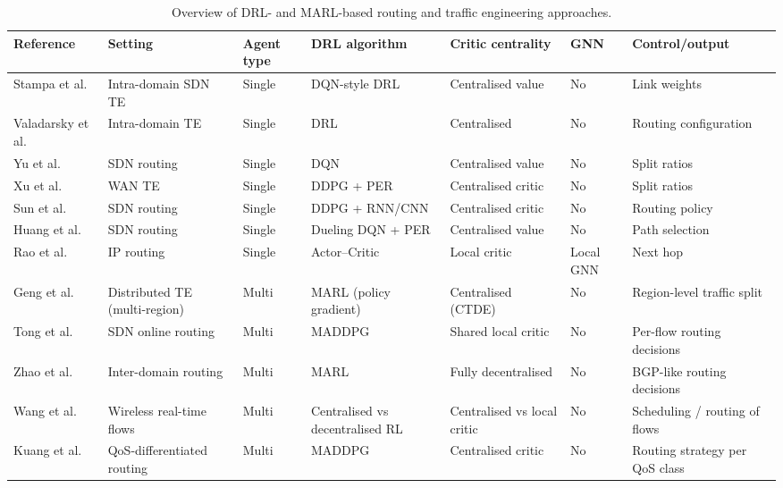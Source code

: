 \documentclass[10pt,journal,comsoc]{IEEEtran}
\begin{document}
\begin{table}[htbp]
  \centering
  \caption{Overview of DRL- and MARL-based routing and traffic engineering approaches.}
  \label{tab:soa_overview}
  \begin{tabular}{|p{2.2cm}|p{2.1cm}|p{1.4cm}|p{1.9cm}|p{1.9cm}|p{1.5cm}|p{2.1cm}|}
    \hline
    \textbf{Reference} & \textbf{Setting} & \textbf{Agent type} & \textbf{DRL algorithm} & \textbf{Critic centrality} & \textbf{GNN} & \textbf{Control/output} \\
    \hline
    Stampa et al.~\cite{stampa2017deep} & Intra-domain SDN TE & Single & DQN-style DRL & Centralised value & No & Link weights \\
    \hline
    Valadarsky et al.~\cite{valadarsky2017learning} & Intra-domain TE & Single & DRL & Centralised & No & Routing configuration \\
    \hline
    Yu et al.~\cite{yu2018drom} & SDN routing & Single & DQN & Centralised value & No & Split ratios \\
    \hline
    Xu et al.~\cite{xu2018experience} & WAN TE & Single & DDPG + PER & Centralised critic & No & Split ratios \\
    \hline
    Sun et al.~\cite{8780950} & SDN routing & Single & DDPG + RNN/CNN & Centralised critic & No & Routing policy \\
    \hline
    Huang et al.~\cite{huang2024intelligent} & SDN routing & Single & Dueling DQN + PER & Centralised value & No & Path selection \\
    \hline
    Rao et al.~\cite{rao2024dar} & IP routing & Single & Actor--Critic & Local critic & Local GNN & Next hop \\
    \hline
    Geng et al.~\cite{geng2020multi} & Distributed TE (multi-region) & Multi & MARL (policy gradient) & Centralised (CTDE) & No & Region-level traffic split \\
    \hline
    Tong et al.~\cite{tong2023intelligent} & SDN online routing & Multi & MADDPG & Shared local critic & No & Per-flow routing decisions \\
    \hline
    Zhao et al.~\cite{zhao2020improving} & Inter-domain routing & Multi & MARL & Fully decentralised & No & BGP-like routing decisions \\
    \hline
    Wang et al.~\cite{wang2024scheduling} & Wireless real-time flows & Multi & Centralised vs decentralised RL & Centralised vs local critic & No & Scheduling / routing of flows \\
    \hline
    Kuang et al.~\cite{kuang2025rs} & QoS-differentiated routing & Multi & MADDPG & Centralised critic & No & Routing strategy per QoS class \\

\end{tabular}
\end{table}
\end{document}

